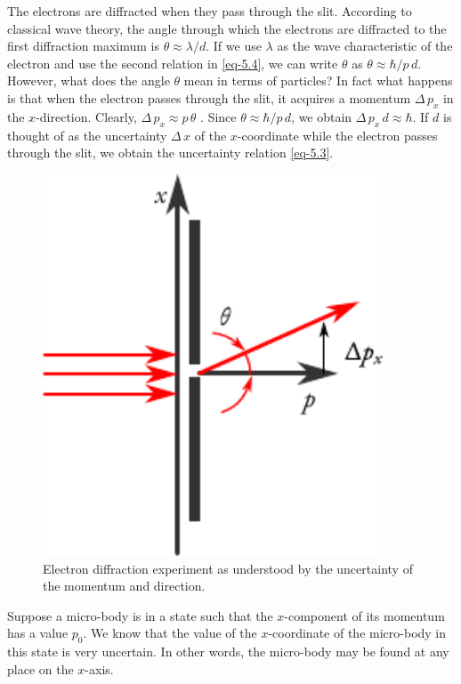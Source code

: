 The electrons are diffracted when they pass through the slit. According to classical wave theory, the angle through which the electrons are diffracted to the first diffraction maximum is $\theta \approx \lambda / d$. If we use $\lambda$ as the wave characteristic of the electron and use the second relation in \eqref{eq-5.4}, we can write $\theta$ as $\theta \approx \hbar /p \, d$. However, what does the angle $\theta$ mean in terms of particles? In fact what happens is that when the electron passes through the slit, it acquires a momentum $\Delta \, p_{x}$ in the $x$-direction. Clearly,  $\Delta \, p_{x} \approx p \, \theta$ . Since $ \theta \approx \hbar /p \, d$, we obtain  $\Delta \, p_{x} \, d \approx \hbar$. If $d$ is thought of as the uncertainty  $\Delta \, {x}$  of the $x$-coordinate while the electron passes through the slit, we obtain the uncertainty relation \eqref{eq-5.3}.



\begin{figure}%
\centering
\includegraphics[width=0.9\textwidth]{figures/diffraction-02.pdf}
\caption{ Electron diffraction experiment as understood by the uncertainty of the momentum and direction.\label{diffraction2}}
\end{figure}


 Suppose a micro-body is in a state such that the $x$-component of its momentum has a value $p_{0}$. We know that the value of the $x$-coordinate of the micro-body in this state is very uncertain. In other words, the micro-body may be found at any place on the $x$-axis.

